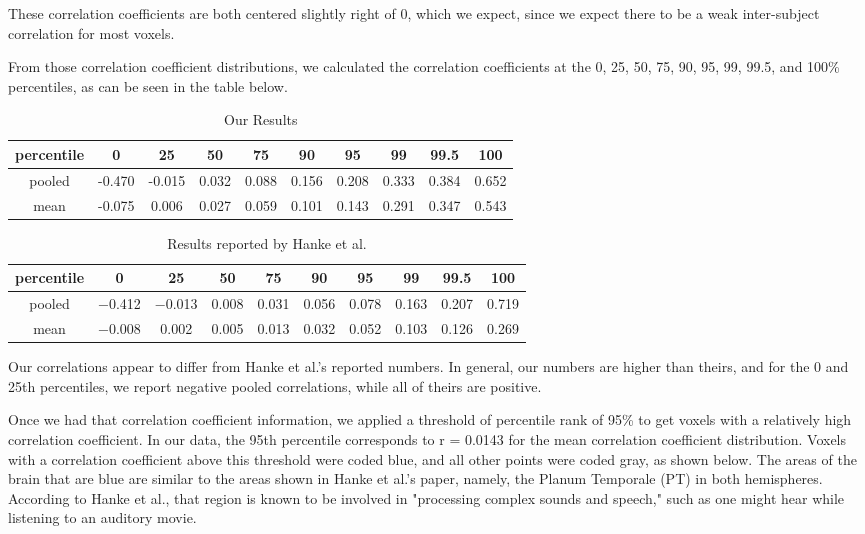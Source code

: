 These correlation coefficients are both centered slightly right of
0, which we expect, since we expect there to be a weak inter-subject
correlation for most voxels.

From those correlation coefficient distributions, we calculated the 
correlation coefficients at the 0, 25, 50, 75, 90, 95, 99, 99.5, and 100\%
percentiles, as can be seen in the table below.
\begin{table}[h!]
  \centering
  \caption{Our Results}
  \label{tab:table1}
  \begin{tabular}{cccccccccc}
    percentile & 0 & 25 & 50 & 75 & 90 & 95 & 99 & 99.5 & 100\\
    \hline
    pooled & -0.470 & -0.015 & 0.032 & 0.088 & 0.156 & 0.208 & 0.333 & 0.384 & 0.652\\
    \hline
    mean & -0.075 & 0.006 & 0.027 & 0.059 & 0.101 & 0.143 & 0.291 & 0.347 & 0.543\\
  \end{tabular}
\end{table}

\begin{table}[h!]
  \centering
  \caption{Results reported by Hanke et al.}
  \label{tab:table1}
  \begin{tabular}{cccccccccc}
    percentile & 0 & 25 & 50 & 75 & 90 & 95 & 99 & 99.5 & 100\\
    \hline
    pooled & −0.412 & −0.013 & 0.008 & 0.031 & 0.056 & 0.078 & 0.163 & 0.207 & 0.719\\
    \hline
    mean & −0.008 & 0.002 & 0.005 & 0.013 & 0.032 & 0.052 & 0.103 & 0.126 & 0.269\\
  \end{tabular}
\end{table}

Our correlations appear to differ from Hanke et al.'s reported numbers.  In 
general, our numbers are higher than theirs, and for the 0 and 25th percentiles, 
we report negative pooled correlations, while all of theirs are positive.

Once we had that correlation coefficient information, we applied a threshold of 
percentile rank of 95\% to get voxels with a relatively high correlation 
coefficient.  In our data, the 95th percentile corresponds to r = 0.0143 for 
the mean correlation coefficient distribution.  Voxels with a correlation
coefficient above this threshold were coded blue, and all other points 
were coded gray, as shown below.  The areas of the brain that are blue
are similar to the areas shown in Hanke et al.'s paper, namely, the
Planum Temporale (PT) in both hemispheres.  According to Hanke et al., 
that region is known to be involved in "processing complex sounds and
speech," such as one might hear while listening to an auditory movie.

